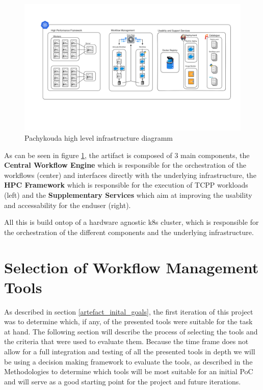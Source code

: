 \begin{figure}[htb]
    \centering
    \includegraphics[width=16cm]{graphics/pachykouda_three_aspects.png}
    \caption[Pachykouda high level diagram showing three main aspects]{Pachykouda high level infrastructure diagramm}
    \label{abb:pachykouda_three_aspects}
\end{figure}


As can be seen in figure \ref{abb:pachykouda_three_aspects}, the artifact is composed of 3 main components, 
the \textbf{Central Workflow Engine} which is responsible for the orchestration of the workflows (center) and interfaces directly with the underlying infrastructure,
the \textbf{\ac{HPC} Framework} which is responsible for the execution of \ac{TCPP} workloads (left)
and the \textbf{Supplementary Services} which aim at improving the usability and accessability for the enduser (right).

All this is build ontop of a hardware agnostic \ac{k8s} cluster, which is responsible for the orchestration of the different components and the underlying infrastructure.

\newpage
\section{Selection of Workflow Management Tools}

As described in section \ref{artefact_inital_goals}, the first iteration of this project was to determine which, if any, of the presented tools were suitable for the task at hand.
The following section will describe the process of selecting the tools and the criteria that were used to evaluate them.
Because the time frame does not allow for a full integration and testing of all the presented tools in depth we will be using a decision making framework to evaluate the tools,
as described in the Methodologies  to determine which tools will be most suitable for an initial \ac{PoC} and will serve as a good starting point for the project and future iterations.

